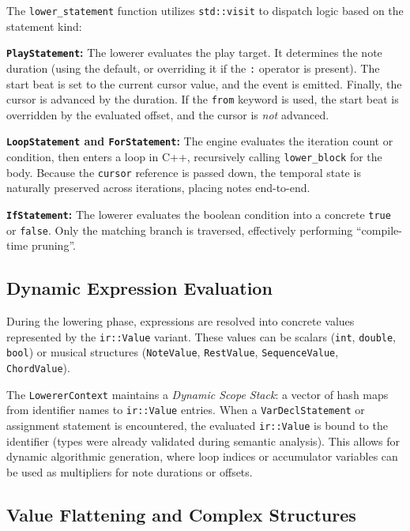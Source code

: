 The \texttt{lower\_statement} function utilizes \texttt{std::visit} to dispatch logic based on the statement kind:

\noindent \textbf{\texttt{PlayStatement}:} The lowerer evaluates the play target.
It determines the note duration (using the default, or overriding it if the \texttt{:} operator is present).
The start beat is set to the current cursor value, and the event is emitted.
Finally, the cursor is advanced by the duration.
If the \texttt{from} keyword is used, the start beat is overridden by the evaluated offset, and the cursor is
\textit{not} advanced.

\noindent \textbf{\texttt{LoopStatement} and \texttt{ForStatement}:} The engine evaluates the iteration count or
condition, then enters a loop in C++, recursively calling \texttt{lower\_block} for the body.
Because the \texttt{cursor} reference is passed down, the temporal state is naturally preserved across iterations,
placing notes end-to-end.

\noindent \textbf{\texttt{IfStatement}:} The lowerer evaluates the boolean condition into a concrete \texttt{true} or
\texttt{false}.
Only the matching branch is traversed, effectively performing ``compile-time pruning''.

\subsection{Dynamic Expression Evaluation}\label{detail-subsec:dynamic-expression-evaluation}

During the lowering phase, expressions are resolved into concrete values represented by the \texttt{ir::Value} variant.
These values can be scalars (\texttt{int}, \texttt{double}, \texttt{bool}) or musical structures (\texttt{NoteValue},
\texttt{RestValue}, \texttt{SequenceValue}, \texttt{ChordValue}).

The \texttt{LowererContext} maintains a \textit{Dynamic Scope Stack}: a vector of hash maps from identifier names to
\texttt{ir::Value} entries.
When a \texttt{VarDeclStatement} or assignment statement is encountered, the evaluated \texttt{ir::Value} is bound to
the identifier (types were already validated during semantic analysis).
This allows for dynamic algorithmic generation, where loop indices or accumulator variables can be used as multipliers
for note durations or offsets.

\subsection{Value Flattening and Complex Structures}\label{detail-subsec:value-flattening-and-complex-structures}

